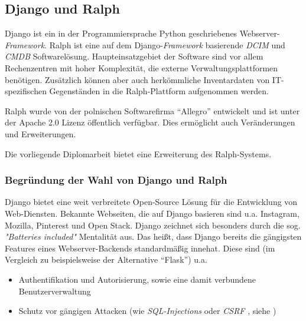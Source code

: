 \hypertarget{django-und-ralph}{%
\subsection{Django und Ralph}\label{django-und-ralph}}

Django ist ein in der Programmiersprache Python geschriebenes
Webserver-\emph{Framework}.
Ralph ist eine auf dem
Django-\emph{Framework}
basierende
\emph{DCIM} und
\emph{CMDB}
Softwarelösung. Haupteinsatzgebiet der Software sind vor allem
Rechenzentren mit hoher Komplexität, die externe Verwaltungsplattformen
benötigen. Zusätzlich können aber auch herkömmliche Inventardaten von
IT-spezifischen Gegenständen in die Ralph-Plattform aufgenommen werden.

Ralph wurde von der polnischen Softwarefirma ``Allegro'' entwickelt und
ist unter der Apache 2.0 Lizenz öffentlich verfügbar. Dies ermöglicht
auch Veränderungen und Erweiterungen.

Die vorliegende Diplomarbeit bietet eine Erweiterung des Ralph-Systems.

\hypertarget{begruxfcndung-der-wahl-von-django-und-ralph}{%
\subsubsection{Begründung der Wahl von Django und
Ralph}\label{begruxfcndung-der-wahl-von-django-und-ralph}}

Django bietet eine weit verbreitete Open-Source Lösung für die
Entwicklung von Web-Diensten. Bekannte Webseiten, die auf Django
basieren sind u.a. Instagram, Mozilla, Pinterest und Open Stack.
\cite{django-overview} Django zeichnet sich besonders durch die sog.
\emph{"Batteries included"}
Mentalität aus. Das heißt, dass Django bereits die gängigsten Features
eines Webserver-Backends standardmäßig innehat. Diese sind (im Vergleich
zu beispielsweise der Alternative ``Flask'') u.a.

\begin{itemize}
\tightlist
\item
  Authentifikation und Autorisierung, sowie eine damit verbundene
  Benutzerverwaltung
\item
  Schutz vor gängigen Attacken (wie
  \emph{SQL-Injections}
  oder
  \emph{CSRF}\cite{csrf}
  , siehe )
\end{itemize}

